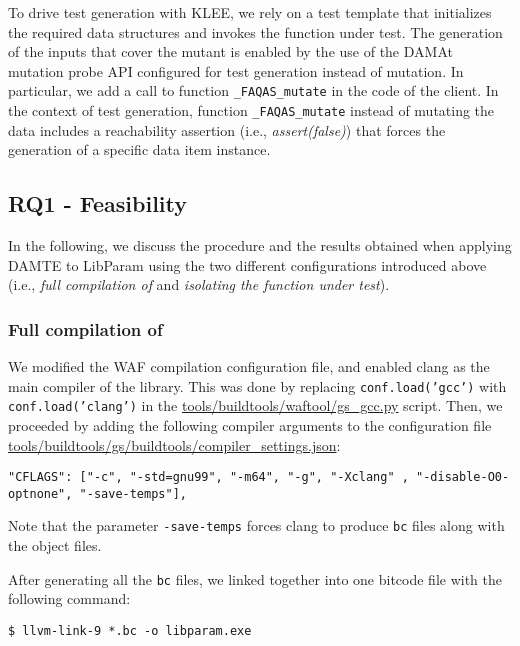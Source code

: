 To drive test generation with KLEE, we rely on a test template that initializes the required data structures and invokes the function under test.
The generation of the inputs that cover the mutant is enabled by the use of the DAMAt mutation probe API configured for test generation instead of mutation.
In particular, we add a call to function \texttt{\_FAQAS\_mutate} in the code of the \PARAM client. In the context of test generation, function \texttt{\_FAQAS\_mutate} instead of mutating the data includes a reachability assertion (i.e., \emph{assert(false)}) that forces the generation of a specific data item instance.

\subsection{RQ1 - Feasibility}



In the following, we discuss the procedure and the results obtained when applying DAMTE to LibParam using the two different configurations introduced above  (i.e., \emph{full compilation of \PARAM} and \emph{isolating the function under test}).

\subsubsection{Full compilation of \PARAM}

We modified the WAF compilation configuration file, and enabled clang as the main compiler of the library. This was done by replacing \texttt{conf.load('gcc')} with \texttt{conf.load('clang')} in the \url{tools/buildtools/waftool/gs_gcc.py} script.
Then, we proceeded by adding the following compiler arguments to the configuration file \url{tools/buildtools/gs/buildtools/compiler_settings.json}:


\begin{lstlisting}[style=CStyle]
"CFLAGS": ["-c", "-std=gnu99", "-m64", "-g", "-Xclang" , "-disable-O0-optnone", "-save-temps"],
\end{lstlisting}

Note that the parameter \texttt{-save-temps} forces clang to produce \texttt{bc} files along with the object files.

After generating all the \texttt{bc} files, we linked together into one bitcode file with the following command:

\begin{lstlisting}[style=CStyle]
$ llvm-link-9 *.bc -o libparam.exe
\end{lstlisting}

